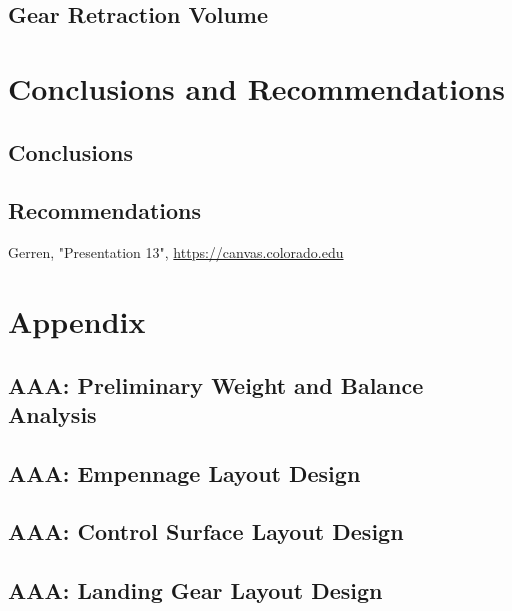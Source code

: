 \documentclass[conf]{new-aiaa}
\begin{document}
\subsection{Gear Retraction Volume}

\section{Conclusions and Recommendations}
\subsection{Conclusions}

\subsection{Recommendations}

\begin{thebibliography}{99}


 Gerren, "Presentation 13", \url{https://canvas.colorado.edu}

\end{thebibliography}

\section{Appendix}



\subsection{AAA: Preliminary Weight and Balance Analysis}

\subsection{AAA: Empennage Layout Design}

\subsection{AAA: Control Surface Layout Design}

\subsection{AAA: Landing Gear Layout Design}
\end{document}
